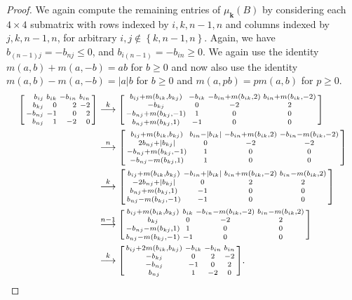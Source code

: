 \documentclass{amsart}
\theoremstyle{definition}
\theoremstyle{remark}
\numberwithin{equation}{section}
\newcommand{\set}[1]{{\left\lbrace #1 \right\rbrace}}
\newcommand{\0}{{\mathbf{0}}}
\newcommand{\kk}{\mathbf{k}}
\begin{document}
\begin{proof}
We again compute the remaining entries of $\mu_\kk(B)$ by considering each $4\times4$ submatrix with rows indexed by $i,k,n-1,n$ and columns indexed by $j,k,n-1,n$, for arbitrary $i,j\not\in\set{k,n-1,n}$.
Again, we have $b_{(n-1)j}=-b_{nj}\le0$, and $b_{i(n-1)}=-b_{in}\ge0$.
We again use the identity $m(a,b)+m(a,-b)=ab$ for $b\ge0$ and now also use the identity $m(a,b)-m(a,-b)=|a|b$ for $b\ge0$ and $m(a,pb)=pm(a,b)$ for $p\ge0$.
\begin{align*}
\begin{bsmallmatrix*}[r]
b_{ij}&b_{ik}&-b_{in}&b_{in}\\
b_{kj}&0&2&-2\\
-b_{nj}&-1&0&2\\
b_{nj}&1&-2&0
\end{bsmallmatrix*}
&\overset{k}{\longrightarrow}
\begin{bsmallmatrix*}
b_{ij}+m(b_{ik},b_{kj}) & -b_{ik} & -b_{in}+m(b_{ik},2) & b_{in}+m(b_{ik},-2)\\
-b_{kj} & 0 & -2 & 2\\
-b_{nj}+m(b_{kj},-1) & 1 & 0 & 0\\
b_{nj}+m(b_{kj},1) & -1 & 0 & 0
\end{bsmallmatrix*}\\
&\overset{n}{\longrightarrow}
\begin{bsmallmatrix*}
b_{ij}+m(b_{ik},b_{kj}) & b_{in}-|b_{ik}| & -b_{in}+m(b_{ik},2) & -b_{in}-m(b_{ik},-2)\\
2b_{nj}+|b_{kj}| & 0 & -2 & -2\\
-b_{nj}+m(b_{kj},-1) & 1 & 0 & 0\\
-b_{nj}-m(b_{kj},1) & 1 & 0 & 0
\end{bsmallmatrix*}\\
&\overset{k}{\longrightarrow}
\begin{bsmallmatrix*}
b_{ij}+m(b_{ik},b_{kj}) & -b_{in}+|b_{ik}| & b_{in}+m(b_{ik},-2) & b_{in}-m(b_{ik},2)\\
-2b_{nj}+|b_{kj}| & 0 & 2 & 2\\
b_{nj}+m(b_{kj},1)  & -1 & 0 & 0\\
b_{nj}-m(b_{kj},-1)& -1 & 0 & 0
\end{bsmallmatrix*}\\
&\overset{n-1}{\longrightarrow}
\begin{bsmallmatrix*}
b_{ij}+m(b_{ik},b_{kj}) & b_{ik} & -b_{in}-m(b_{ik},-2) & b_{in}-m(b_{ik},2)\\
b_{kj}& 0 & -2 & 2\\
-b_{nj}-m(b_{kj},1)& 1 & 0 & 0\\
b_{nj}-m(b_{kj},-1) & -1 & 0 & 0
\end{bsmallmatrix*}\\
&\overset{k}{\longrightarrow}
\begin{bsmallmatrix*}
b_{ij}+2m(b_{ik},b_{kj}) & -b_{ik} & -b_{in} & b_{in}\\
-b_{kj} & 0 & 2 & -2\\
-b_{nj} & -1 & 0 & 2\\
b_{nj} & 1 & -2 & 0
\end{bsmallmatrix*}.
\end{align*}


\end{proof}
\end{document}
